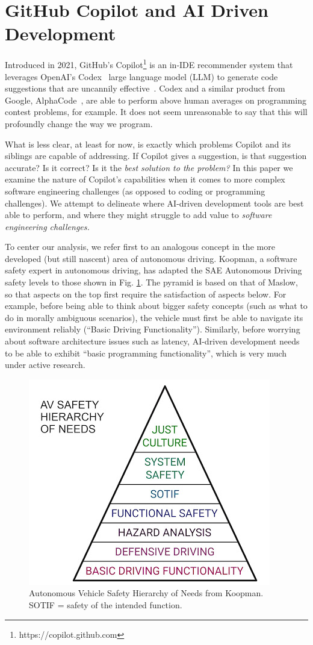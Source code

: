\section{GitHub Copilot and AI Driven Development}
Introduced in 2021, GitHub's Copilot\footnote{https://copilot.github.com} is an in-IDE recommender system that leverages OpenAI's Codex~\cite{copilot} large language model (LLM) to generate code suggestions that are uncannily effective~\cite{copilot}. Codex and a similar product from Google, AlphaCode~\cite{alphacode}, are able to perform above human averages on programming contest problems, for example. It does not seem unreasonable to say that this will profoundly change the way we program.

What is less clear, at least for now, is exactly which problems Copilot and its siblings are capable of addressing. If Copilot gives a suggestion, is that suggestion accurate? Is it correct? Is it the \emph{best solution to the problem?} 
In this paper we examine the nature of Copilot's capabilities when it comes to more complex software engineering challenges (as opposed to coding or programming challenges). We attempt to delineate where AI-driven development tools are best able to perform, and where they might struggle to add value to \emph{software engineering challenges.}

To center our analysis, we refer first to an analogous concept in the more developed (but still nascent) area of autonomous driving. 
Koopman, a software safety expert in autonomous driving, has adapted the SAE Autonomous Driving safety levels \cite{sae} to those shown in Fig. \ref{fig:koopman_pyramid}. 
The pyramid is based on that of Maslow, so that aspects on the top first require the satisfaction of aspects below. 
For example, before being able to think about bigger safety concepts (such as what to do in morally ambiguous scenarios), the vehicle must first be able to navigate its environment reliably (``Basic Driving Functionality'').
Similarly, before worrying about software architecture issues such as latency, AI-driven development needs to be able to exhibit ``basic programming functionality'', which is very much under active research.

\begin{figure}
    \centering
    \includegraphics[width=.5\linewidth]{Figures/koopman_pyramid.jpeg}
    \caption{Autonomous Vehicle Safety Hierarchy of Needs from Koopman\cite{koopman}. SOTIF = safety of the intended function.}
    \label{fig:koopman_pyramid}
\end{figure}
